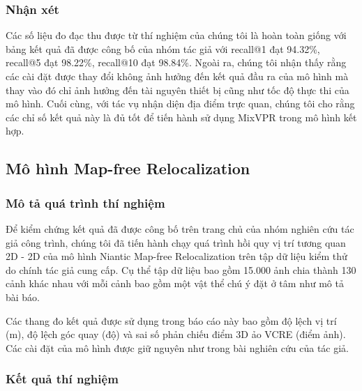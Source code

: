 \subsubsection*{Nhận xét}

Các số liệu đo đạc thu được từ thí nghiệm của chúng tôi là hoàn toàn giống với bảng kết quả đã được công bố của nhóm tác giả với recall@1 đạt 94.32\%, recall@5 đạt 98.22\%, recall@10 đạt 98.84\%. Ngoài ra, chúng tôi nhận thấy rằng các cài đặt được thay đổi không ảnh hưởng đến kết quả đầu ra của mô hình mà thay vào đó chỉ ảnh hưởng đến tài nguyên thiết bị cũng như tốc độ thực thi của mô hình. Cuối cùng, với tác vụ nhận diện địa điểm trực quan, chúng tôi cho rằng các chỉ số kết quả này là đủ tốt để tiến hành sử dụng MixVPR trong mô hình kết hợp.

\subsection{Mô hình Map-free Relocalization}
\subsubsection*{Mô tả quá trình thí nghiệm}

Để kiểm chứng kết quả đã được công bố trên trang chủ của nhóm nghiên cứu tác giả công trình, chúng tôi đã tiến hành chạy quá trình hồi quy vị trí tương quan 2D - 2D của mô hình Niantic Map-free Relocalization trên tập dữ liệu kiểm thử do chính tác giả cung cấp. Cụ thể tập dữ liệu bao gồm 15.000 ảnh chia thành 130 cảnh khác nhau với mỗi cảnh bao gồm một vật thể chú ý đặt ở tâm như mô tả bài báo.

Các thang đo kết quả được sử dụng trong báo cáo này bao gồm độ lệch vị trí (m), độ lệch góc quay (độ) và sai số phản chiếu điểm 3D ảo VCRE (điểm ảnh). Các cài đặt của mô hình được giữ nguyên như trong bài nghiên cứu của tác giả.

\subsubsection*{Kết quả thí nghiệm}

